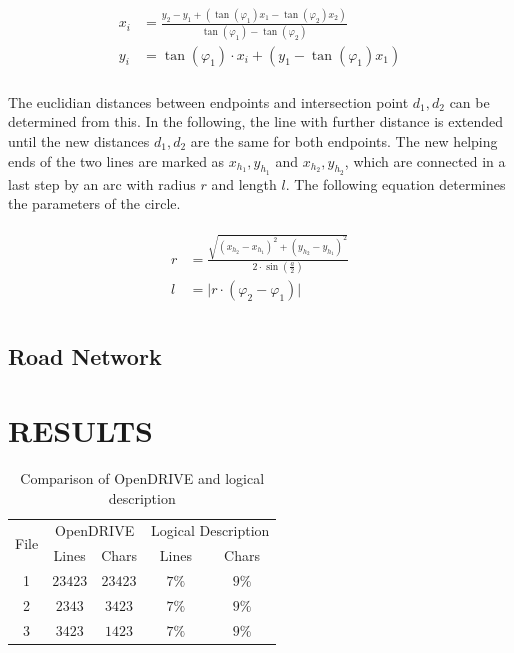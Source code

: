 \documentclass[a4paper, 10pt, conference]{ieeeconf}      %
\begin{document}
    \begin{align}
        \begin{split}
            x_i &= \frac{y_2 - y_1 + \left(\tan(\varphi_1) x_1 - \tan(\varphi_2) x_2\right)}{\tan(\varphi_1) - \tan(\varphi_2)} \\
            y_i &= \tan(\varphi_1) \cdot x_i+ \left(y_1 - \tan(\varphi_1) x_1\right)\\
        \end{split}     
    \end{align}

    The euclidian distances between endpoints and intersection point \(d_1, d_2\) can be determined from this. In the following, the line with further distance is extended until the new distances \(d_1, d_2\) are the same for both endpoints. The new helping ends of the two lines are marked as \(x_{h_1}, y_{h_1}\) and \(x_{h_2}, y_{h_2}\), which are connected in a last step by an arc with radius \(r\) and length \(l\). The following equation determines the parameters of the circle.

    \begin{align}
        \begin{split}           
        r &= \frac{\sqrt{\left(x_{h_2} - x_{h_1}\right)^2 + \left(y_{h_2} - y_{h_1}\right)^2}}{2 \cdot \sin\left(\frac{a}{2}\right)} \\
        l &= \vert r \cdot \left(\varphi_2 - \varphi_1\right) \vert \\  
        \end{split}
    \end{align}


\subsection{Road Network}

\clearpage %
\section{RESULTS}

\begin{table}[h]
\caption{Comparison of OpenDRIVE and logical description}
\label{tab_comparison}
\def\arraystretch{1.5}
\begin{center}
\begin{tabular}{c|cccc}
\multirow{2}{*}{File} & \multicolumn{2}{c}{OpenDRIVE} & \multicolumn{2}{c}{Logical Description}\\
& Lines & Chars & Lines & Chars \\
\hline
1 & $23423$ & $23423$& $7\%$ &$9\%$\\
2 & $2343$ & $3423$& $7\%$ &$9\%$\\
3 & $3423$ & $1423$& $7\%$ &$9\%$
\end{tabular}
\end{center}
\end{table}
\end{document}
